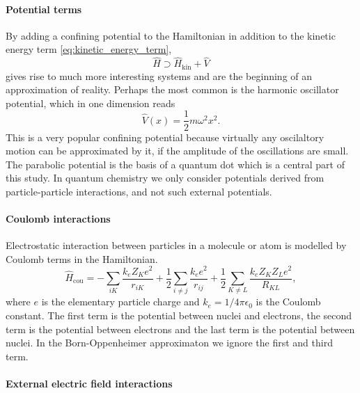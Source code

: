     \paragraph{Potential terms}

    By adding a confining potential to the Hamiltonian in addition to the kinetic 
    energy term \autoref{eq:kinetic_energy_term},
    \begin{equation}
        \hat{H} \supset \hat{H}_\text{kin} + \hat{V}
    \end{equation}
    gives rise to much more interesting systems and are the beginning of an approximation 
    of reality. Perhaps the most common is the harmonic oscillator potential, which 
    in one dimension reads 
    \begin{equation}
        \hat{V}(x) = \frac{1}{2}m\omega^2x^2.
    \end{equation}
    This is a very popular confining potential because virtually any oscilaltory motion can 
    be approximated by it, if the amplitude of the oscillations are small. The parabolic 
    potential is the basis of a quantum dot which is a central part of this study. 
    In quantum chemistry we only consider potentials derived from particle-particle 
    interactions, and not such external potentials.

    \paragraph{Coulomb interactions}

    Electrostatic interaction between particles in a molecule or atom is 
    modelled by Coulomb terms in the Hamiltonian. 
    \begin{equation}
            \hat{H}_{\text{cou}} 
                = -\sum_{iK}\frac{k_eZ_Ke^2}{r_{iK}} 
                    + \frac{1}{2}\sum_{i \neq j} \frac{k_e e^2}{r_{ij}} 
                    + \frac{1}{2}\sum_{K \neq L} \frac{k_eZ_K Z_Le^2}{R_{KL}},
    \end{equation}
    where $e$ is the elementary particle charge and $k_e = 1 / 4\pi\epsilon_0$ is the 
    Coulomb constant.
    The first term is the potential between nuclei and electrons, the second term is
    the potential between electrons and the last term is the potential between 
    nuclei. In the Born-Oppenheimer approximaton we ignore the first and third term.

    \paragraph{External electric field interactions}
   
